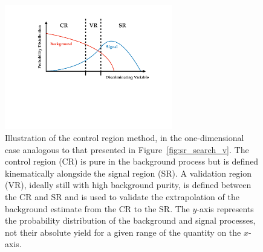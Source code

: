 \begin{figure}[!htb]
    \begin{center}
        \includegraphics[width=0.65\textwidth]{figures/common_ana/sr_search_v_CRPDF}
        \caption{
            Illustration of the control region method, in the one-dimensional case analogous to that
            presented in Figure~\ref{fig:sr_search_v}.
            The control region (CR) is pure in the background process but is defined kinematically alongside the signal region (SR).
            A validation region (VR), ideally still with high background purity, is defined between the CR and SR and is used to validate
            the extrapolation of the background estimate from the CR to the SR.
            The $y$-axis represents the probability distribution of the background and signal
            processes, not their absolute yield for a given range of the quantity on the $x$-axis.
        }
        \label{fig:sr_search_v_CR}
    \end{center}
\end{figure}

